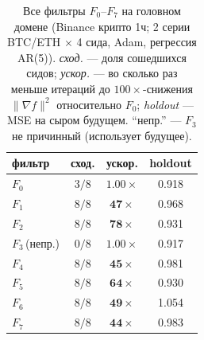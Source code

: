 \begin{table}[t]
\caption{Все фильтры $F_0$--$F_7$ на головном домене (Binance крипто 1ч; 2 серии BTC/ETH $\times$ 4 сида, Adam, регрессия AR(5)). \emph{сход.} --- доля сошедшихся сидов; \emph{ускор.} --- во сколько раз меньше итераций до $100\times$-снижения $\|\nabla f\|^2$ относительно $F_0$; \emph{holdout} --- MSE на сыром будущем. ``непр.'' --- $F_3$ не причинный (использует будущее).}
\label{tab:crypto}
\centering\begin{tabular}{lccc}
\toprule
фильтр & сход. & ускор. & holdout\\
\midrule
$F_0$ & $3/8$ & $1.00\times$ & 0.918\\
$F_1$ & $8/8$ & $\mathbf{47\times}$ & 0.968\\
$F_2$ & $8/8$ & $\mathbf{78\times}$ & 0.931\\
$F_3$\,(непр.) & $0/8$ & $1.00\times$ & 0.917\\
$F_4$ & $8/8$ & $\mathbf{45\times}$ & 0.981\\
$F_5$ & $8/8$ & $\mathbf{64\times}$ & 0.930\\
$F_6$ & $8/8$ & $\mathbf{49\times}$ & 1.054\\
$F_7$ & $8/8$ & $\mathbf{44\times}$ & 0.983\\
\bottomrule
\end{tabular}\end{table}
